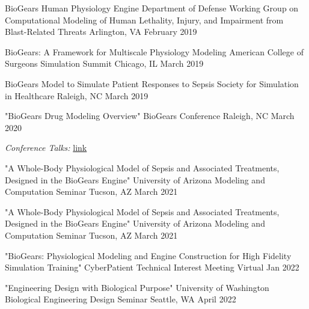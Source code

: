 \begin{cventries}
  \cventry
    {BioGears Human Physiology Engine} %
    {Department of Defense Working Group on Computational Modeling of Human Lethality, Injury, and Impairment from Blast-Related Threats} %
    {Arlington, VA} %
    {February 2019} %
    {
    }


  \cventry
    {BioGears: A Framework for Multiscale Physiology Modeling} %
    {American College of Surgeons Simulation Summit} %
    {Chicago, IL} %
    {March 2019} %
    {
    }

  \cventry
    {BioGears Model to Simulate Patient Responses to Sepsis} %
    {Society for Simulation in Healthcare} %
    {Raleigh, NC} %
    {March 2019} %
    {
    }


  \cventry
    {"BioGears Drug Modeling Overview"} %
    {BioGears Conference} %
    {Raleigh, NC} %
    {March 2020} %
     {
    \begin{cvitems} %
    \item {\textit{Conference Talks:} \href{https://www.youtube.com/channel/UCJB9TkmUbLyyXEFc4waJzDg}{link}}
    \end{cvitems}
     }

  \cventry
    {"A Whole-Body Physiological Model of Sepsis and Associated Treatments, Designed in the
BioGears Engine"} %
    {University of Arizona Modeling and Computation Seminar} %
    {Tucson, AZ} %
    {March 2021} %
     {
     }

  \cventry
    {"A Whole-Body Physiological Model of Sepsis and Associated Treatments, Designed in the
BioGears Engine"} %
    {University of Arizona Modeling and Computation Seminar} %
    {Tucson, AZ} %
    {March 2021} %
     {
     }

  \cventry
    {"BioGears: Physiological Modeling and Engine Construction for High Fidelity Simulation Training"} %
    {CyberPatient Technical Interest Meeting} %
    {Virtual} %
    {Jan 2022} %
     {
     }

  \cventry
    {"Engineering Design with Biological Purpose"} %
    {University of Washington Biological Engineering Design Seminar} %
    {Seattle, WA} %
    {April 2022} %
     {
     }


\end{cventries}
